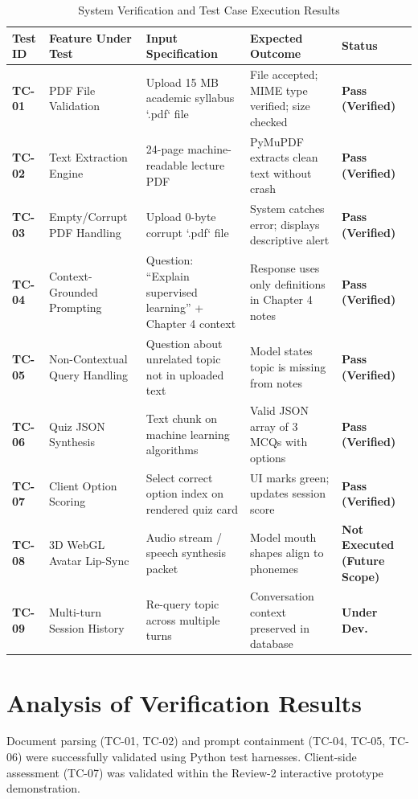 \documentclass[11pt,a4paper]{report}
\begin{document}
\begin{table}[H]
\centering
\scriptsize
\renewcommand{\arraystretch}{1.25}
\begin{tabularx}{\textwidth}{p{1.2cm}p{2.8cm}p{3.5cm}p{3.8cm}p{2.2cm}}
\toprule
\textbf{Test ID} & \textbf{Feature Under Test} & \textbf{Input Specification} & \textbf{Expected Outcome} & \textbf{Status} \\
\midrule
\textbf{TC-01} & PDF File Validation & Upload 15 MB academic syllabus `.pdf` file & File accepted; MIME type verified; size checked & \textbf{Pass (Verified)} \\
\midrule
\textbf{TC-02} & Text Extraction Engine & 24-page machine-readable lecture PDF & PyMuPDF extracts clean text without crash & \textbf{Pass (Verified)} \\
\midrule
\textbf{TC-03} & Empty/Corrupt PDF Handling & Upload 0-byte corrupt `.pdf` file & System catches error; displays descriptive alert & \textbf{Pass (Verified)} \\
\midrule
\textbf{TC-04} & Context-Grounded Prompting & Question: ``Explain supervised learning'' + Chapter 4 context & Response uses only definitions in Chapter 4 notes & \textbf{Pass (Verified)} \\
\midrule
\textbf{TC-05} & Non-Contextual Query Handling & Question about unrelated topic not in uploaded text & Model states topic is missing from notes & \textbf{Pass (Verified)} \\
\midrule
\textbf{TC-06} & Quiz JSON Synthesis & Text chunk on machine learning algorithms & Valid JSON array of 3 MCQs with options & \textbf{Pass (Verified)} \\
\midrule
\textbf{TC-07} & Client Option Scoring & Select correct option index on rendered quiz card & UI marks green; updates session score & \textbf{Pass (Verified)} \\
\midrule
\textbf{TC-08} & 3D WebGL Avatar Lip-Sync & Audio stream / speech synthesis packet & Model mouth shapes align to phonemes & \textbf{Not Executed (Future Scope)} \\
\midrule
\textbf{TC-09} & Multi-turn Session History & Re-query topic across multiple turns & Conversation context preserved in database & \textbf{Under Dev.} \\
\bottomrule
\end{tabularx}
\caption{System Verification and Test Case Execution Results}
\label{tab:test_cases}
\end{table}

\section{Analysis of Verification Results}
Document parsing (TC-01, TC-02) and prompt containment (TC-04, TC-05, TC-06) were successfully validated using Python test harnesses. Client-side assessment (TC-07) was validated within the Review-2 interactive prototype demonstration.
\clearpage
\end{document}
